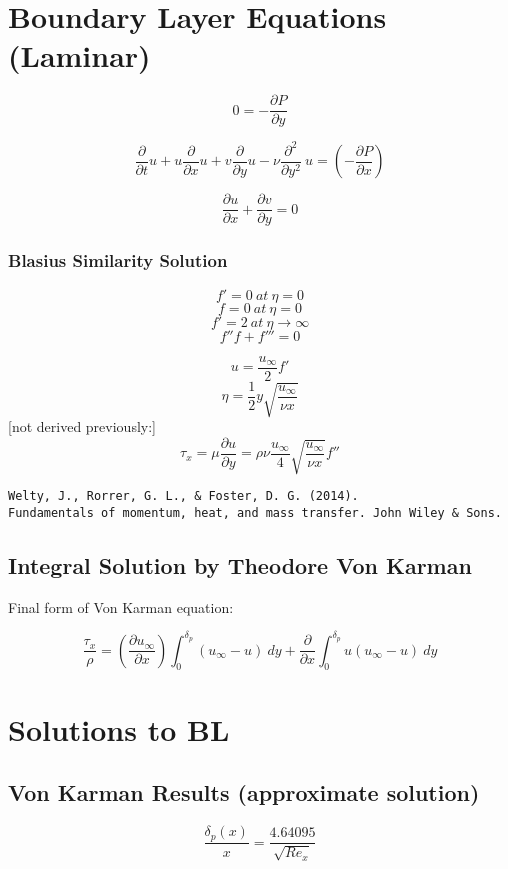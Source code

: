 \documentclass[11pt]{article}
\begin{document}
\section{Boundary Layer Equations (Laminar)}
$$0 = - \frac{\partial P}{\partial y} $$

$$\frac{\partial }{\partial t} u + u  \frac{\partial}{\partial x } u + v  \frac{\partial}{\partial y} u -  \nu  \frac{\partial^2}{\partial y^2} \ u  =  ( -  \frac{\partial P}{\partial x} )$$

$$\frac{\partial u}{\partial x} + \frac{\partial v}{\partial y} = 0$$

\subsubsection{Blasius Similarity Solution}

$$f'=0\ at\ \eta=0$$
$$f=0\ at\ \eta=0$$
$$f' =2 \ at \ \eta\rightarrow \infty$$
$$f''f+f'''=0$$

$$u = \frac{u_\infty}{2} f'$$
$$\eta  = \frac{1}{2}y \sqrt{\frac{u_\infty}{\nu x}} $$
[not derived previously:]
$$\tau_x = \mu \frac{\partial u}{\partial y} = \rho \nu \frac{u_\infty}{4} \sqrt{\frac{u_\infty}{\nu x}} f''$$

\begin{verbatim}
Welty, J., Rorrer, G. L., & Foster, D. G. (2014). 
Fundamentals of momentum, heat, and mass transfer. John Wiley & Sons.
\end{verbatim}

\subsection{Integral Solution by Theodore Von Karman}
Final form of Von Karman equation:

$$ \frac{\tau_x}{\rho} = ( \frac{\partial u_\infty}{\partial x}) \int_0^{\delta_p} ( u_\infty - u ) \ dy  + \frac{\partial}{\partial x}   \int_0^{\delta_p} u( u_\infty - u) \ dy $$

\section{Solutions to BL}

\subsection{Von Karman Results (approximate solution)}
$$ \frac{\delta_p (x)}{x} =   \frac{4.64095 }{\sqrt{Re_x} }$$
\end{document}

